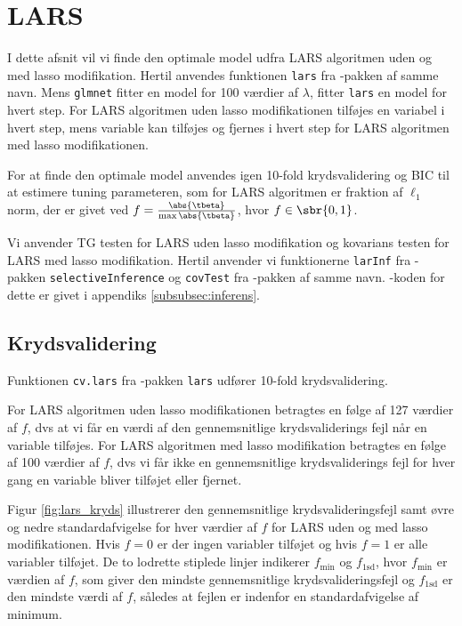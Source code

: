 \section{LARS}
I dette afsnit vil vi finde den optimale model udfra LARS algoritmen uden og med lasso modifikation. 
Hertil anvendes funktionen \texttt{lars} fra \Rlang-pakken af samme navn.
Mens \texttt{glmnet} fitter en model for 100 værdier af \(\lambda\), fitter \texttt{lars} en model for hvert step.
For LARS algoritmen uden lasso modifikationen tilføjes en variabel i hvert step, mens variable kan tilføjes og fjernes i hvert step for LARS algoritmen med lasso modifikationen.

For at finde den optimale model anvendes igen 10-fold krydsvalidering og BIC til at estimere tuning parameteren, som for LARS algoritmen er fraktion af \(\ell_1\) norm, der er givet ved \(f = \frac{\abs{\tbeta}}{\max \abs{\tbeta}}\), hvor \(f \in \sbr{0,1}\).

Vi anvender TG testen for LARS uden lasso modifikation og kovarians testen for LARS med lasso modifikation.   
Hertil anvender vi funktionerne \texttt{larInf} fra \Rlang-pakken \texttt{selectiveInference} og \texttt{covTest} fra \Rlang-pakken af samme navn. 
\Rlang-koden for dette er givet i appendiks \ref{subsubsec:inferens}.


\subsection{Krydsvalidering}
Funktionen \texttt{cv.lars} fra \Rlang-pakken \texttt{lars} udfører 10-fold krydsvalidering.

For LARS algoritmen uden lasso modifikationen betragtes en følge af 127 værdier af $f$, dvs at vi får en værdi af den gennemsnitlige krydsvaliderings fejl når en variable tilføjes.
For LARS algoritmen med lasso modifikation betragtes en følge af 100 værdier af $f$, dvs vi får ikke en gennemsnitlige krydsvaliderings fejl for hver gang en variable bliver tilføjet eller fjernet. 

Figur \ref{fig:lars_kryds} illustrerer den gennemsnitlige krydsvalideringsfejl samt øvre og nedre standardafvigelse for hver værdier af $f$ for LARS uden og med lasso modifikationen.
Hvis $f = 0$ er der ingen variabler tilføjet og hvis $f=1$ er alle variabler tilføjet. 
De to lodrette stiplede linjer indikerer \(f_{\text{min}}\) og \(f_\text{1sd}\), hvor \(f_{\text{min}}\) er værdien af \(f\), som giver den mindste gennemsnitlige krydsvalideringsfejl og \(f_\text{1sd}\) er den mindste værdi af \(f\), således at fejlen er indenfor en standardafvigelse af minimum. 


